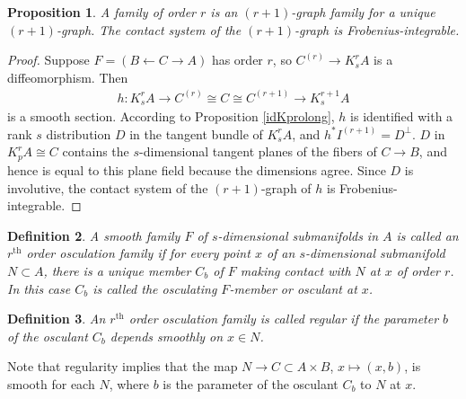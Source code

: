 \documentclass[12pt]{article}
\numberwithin{equation}{section}
\theoremstyle{plain}
\newtheorem{definition}{Definition}[section]
\newtheorem{proposition}[definition]{Proposition}
\theoremstyle{definition}
\newcommand{\la}{\leftarrow}
\newcommand{\ra}{\rightarrow}
\begin{document}
\begin{proposition}\label{frob} A family of order $r$ is an $(r+1)$-graph family for a unique $(r+1)$-graph. The contact system of the $(r+1)$-graph is Frobenius-integrable.
\end{proposition}
\begin{proof} Suppose $F=(B\la C\ra A)$ has order $r$, so $C^{(r)}\ra K^{r}_{s}A$ is a diffeomorphism. Then
\begin{align*}
h:K^{r}_{s}A\ra C^{(r)}\cong C\cong C^{(r+1)}\ra K^{r+1}_{s}A
\end{align*}
is a smooth section. According to Proposition \ref{idKprolong}, $h$ is identified with a rank $s$ distribution $D$ in the tangent bundle of $K^{r}_{s}A$, and $h^{*}I^{(r+1)}=D^{\perp}$. $D$ in $K^{r}_{p}A\cong C$ contains the $s$-dimensional tangent planes of the fibers of $C\ra B$, and hence is equal to this plane field because the dimensions agree. Since $D$ is involutive, the contact system of the $(r+1)$-graph of $h$ is Frobenius-integrable.
\end{proof}

\begin{definition} A smooth family $F$ of $s$-dimensional submanifolds in $A$ is called an \emph{$r^{\text{th}}$ order osculation family} if for every point $x$ of an $s$-dimensional submanifold $N\subset A$, there is a unique member $C_b$ of $F$ making contact with $N$ at $x$ of order $r$. In this case $C_b$ is called the \emph{osculating $F$-member} or \emph{osculant} at $x$.
\end{definition}

\begin{definition} An $r^{\text{th}}$ order osculation family is called \emph{regular} if the parameter $b$ of the osculant $C_b$ depends smoothly on $x\in N$.
\end{definition}

Note that regularity implies that the map $N\ra C\subset A\times B$, $x\mapsto(x,b)$, is smooth for each $N$, where $b$ is the parameter of the osculant $C_b$ to $N$ at $x$.
\end{document}
